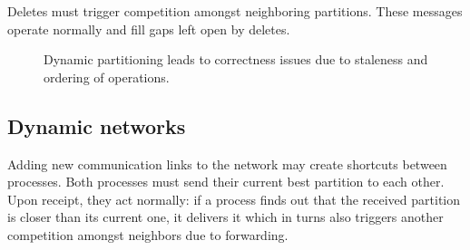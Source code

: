 
\noindent Deletes must trigger competition amongst neighboring
partitions. These  messages operate normally and fill gaps
left open by deletes.

\begin{figure*}
  \begin{center}
    \hspace{10pt}
    \caption{\label{fig:proof}Dynamic partitioning leads to correctness issues due to
      staleness and ordering of operations.}
  \end{center}
\end{figure*}

\subsection{Dynamic networks}
Adding new communication links to the network may create shortcuts
between processes. Both processes must send their current best
partition to each other. Upon receipt, they act normally: if a process
finds out that the received partition is closer than its current one,
it delivers it which in turns also triggers another competition
amongst neighbors due to forwarding.

